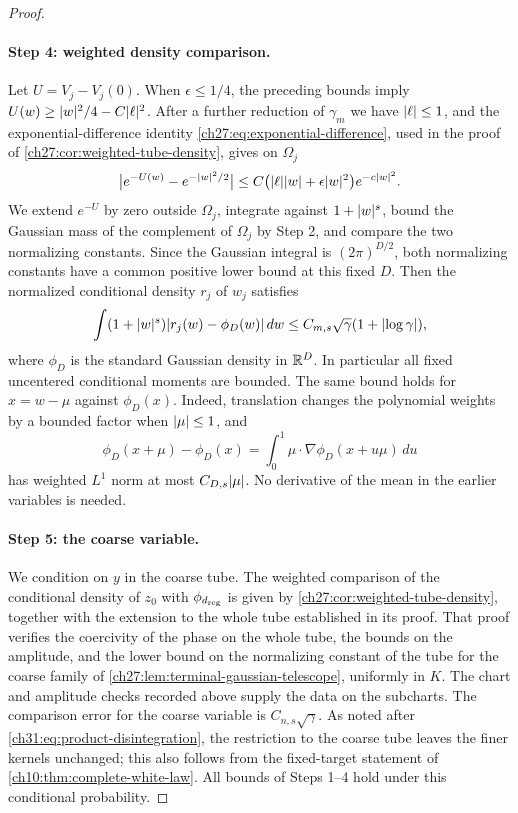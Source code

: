\begin{proof}
\paragraph{Step 4: weighted density comparison.}
Let $U=V_j-V_j(0)$. When $\epsilon\le1/4$, the preceding bounds imply $U(w)\ge\lvert w\rvert^2/4-C\lvert \ell\rvert^2$. After a further reduction of $\gamma_m$ we have $\lvert \ell\rvert\le1$, and the exponential-difference identity \eqref{ch27:eq:exponential-difference}, used in the proof of \cref{ch27:cor:weighted-tube-density}, gives on $\Omega_j$
\[
 \bigl\lvert e^{-U(w)}-e^{-\lvert w\rvert^2/2}\bigr\rvert\le C\bigl(\lvert \ell\rvert\lvert w\rvert+\epsilon\lvert w\rvert^2\bigr)e^{-c\lvert w\rvert^2}.
\]
We extend $e^{-U}$ by zero outside $\Omega_j$, integrate against $1+\lvert w\rvert^s$, bound the Gaussian mass of the complement of $\Omega_j$ by Step 2, and compare the two normalizing constants. Since the Gaussian integral is $(2\pi)^{D/2}$, both normalizing constants have a common positive lower bound at this fixed $D$. Then the normalized conditional density $r_j$ of $w_j$ satisfies
\begin{equation}\label{ch31:eq:weighted-fiber-density}
 \int(1+\lvert w\rvert^s)\lvert r_j(w)-\phi_D(w)\rvert\,dw\le C_{m,s}\sqrt\gamma(1+\lvert \log\gamma\rvert),
\end{equation}
where $\phi_D$ is the standard Gaussian density in $\mathbb R^D$. In particular all fixed uncentered conditional moments are bounded. The same bound holds for $x=w-\mu$ against $\phi_D(x)$. Indeed, translation changes the polynomial weights by a bounded factor when $\lvert \mu\rvert\le1$, and
\[
 \phi_D(x+\mu)-\phi_D(x)=\int_0^1\mu\cdot\nabla\phi_D(x+u\mu)\,du
\]
has weighted $L^1$ norm at most $C_{D,s}\lvert \mu\rvert$. No derivative of the mean in the earlier variables is needed.

\paragraph{Step 5: the coarse variable.}
We condition on $y$ in the coarse tube. The weighted comparison of the conditional density of $z_0$ with $\phi_{d_{\rm reg}}$ is given by \cref{ch27:cor:weighted-tube-density}, together with the extension to the whole tube established in its proof. That proof verifies the coercivity of the phase on the whole tube, the bounds on the amplitude, and the lower bound on the normalizing constant of the tube for the coarse family of \cref{ch27:lem:terminal-gaussian-telescope}, uniformly in $K$. The chart and amplitude checks recorded above supply the data on the subcharts. The comparison error for the coarse variable is $C_{n,s}\sqrt\gamma$. As noted after \eqref{ch31:eq:product-disintegration}, the restriction to the coarse tube leaves the finer kernels unchanged; this also follows from the fixed-target statement of \cref{ch10:thm:complete-white-law}. All bounds of Steps 1--4 hold under this conditional probability.


\end{proof}
